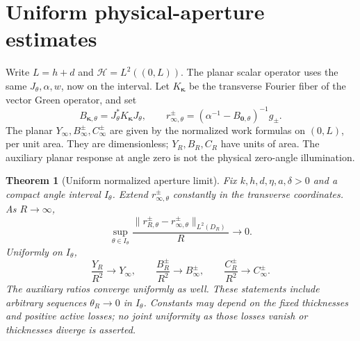 \documentclass[11pt]{article}
\newtheorem{theorem}{Theorem}[section]
\newcommand{\norm}[1]{\lVert #1\rVert}
\begin{document}
\section{Uniform physical-aperture estimates}\label{sec:aperture}
Write $L=h+d$ and $\mathcal H=L^2((0,L))$. The planar scalar operator uses the same $J_\theta,\alpha,w$, now on the interval. Let $K_{\boldsymbol\kappa}$ be the transverse Fourier fiber of the vector Green operator, and set
\begin{equation}\label{eq:fibers}
 B_{\boldsymbol\kappa,\theta}=J_\theta^*K_{\boldsymbol\kappa}J_\theta,\qquad
 r_{\infty,\theta}^\pm=(\alpha^{-1}-B_{\mathbf0,\theta})^{-1}g_\pm.
\end{equation}
The planar $Y_\infty,B_\infty^\pm,C_\infty^\pm$ are given by the normalized work formulas on $(0,L)$, per unit area. They are dimensionless; $Y_R,B_R,C_R$ have units of area. The auxiliary planar response at angle zero is not the physical zero-angle illumination.

\begin{theorem}[Uniform normalized aperture limit]\label{thm:aperture}
Fix $k,h,d,\eta,a,\delta>0$ and a compact angle interval $I_\theta$. Extend $r_{\infty,\theta}^\pm$ constantly in the transverse coordinates. As $R\to\infty$,
\begin{equation}\label{eq:aperture-current}
 \sup_{\theta\in I_\theta}\frac{\norm{r_{R,\theta}^\pm-r_{\infty,\theta}^\pm}_{L^2(D_R)}}{R}\longrightarrow0.
\end{equation}
Uniformly on $I_\theta$,
\begin{equation}\label{eq:aperture-power}
 \frac{Y_R}{R^2}\to Y_\infty,\qquad
 \frac{B_R^\pm}{R^2}\to B_\infty^\pm,\qquad
 \frac{C_R^\pm}{R^2}\to C_\infty^\pm.
\end{equation}
The auxiliary ratios converge uniformly as well. These statements include arbitrary sequences $\theta_R\to0$ in $I_\theta$. Constants may depend on the fixed thicknesses and positive active losses; no joint uniformity as those losses vanish or thicknesses diverge is asserted.
\end{theorem}
\end{document}
